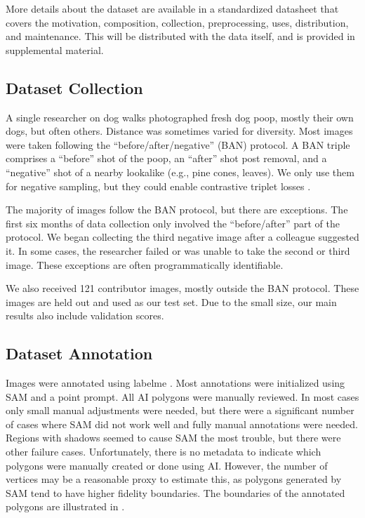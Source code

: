 \documentclass{article}
\begin{document}
More details about the dataset are available in a standardized datasheet
\cite{gebru_datasheets_2021} that covers the motivation, composition,
collection, preprocessing, uses, distribution, and maintenance. This will be
distributed with the data itself, and is provided in supplemental material.

\subsection{Dataset Collection}

A single researcher on dog walks photographed fresh dog poop, mostly their own
dogs, but often others. Distance was sometimes varied for diversity. Most
images were taken following the ``before/after/negative'' (BAN) protocol.  
A BAN triple comprises a ``before'' shot of the poop, an ``after'' shot
post removal, and a ``negative'' shot of a nearby lookalike (e.g., pine cones,
leaves).  We only use them for negative sampling, but they could enable
contrastive triplet losses \cite{schroff_facenet_2015}.

The majority of images follow the BAN protocol, but there are exceptions.
The first six months of data collection only involved the ``before/after'' part of the protocol. 
We began collecting the third negative image after a colleague suggested it.
In some cases, the researcher failed or was unable to take the second or third image.
These exceptions are often programmatically identifiable.
  
We also received 121 contributor images, mostly outside the BAN protocol.
These images are held out and used as our test set.
Due to the small size, our main results also include validation scores.

\subsection{Dataset Annotation}

Images were annotated using labelme \cite{wada_labelmeailabelme_nodate}.
Most annotations were initialized using SAM and a point prompt.
All AI polygons were manually reviewed.
In most cases only small manual adjustments were needed, but there were a significant number of cases where
  SAM did not work well and fully manual annotations were needed.
Regions with shadows seemed to cause SAM the most trouble, but there were other failure cases.
Unfortunately, there is no metadata to indicate which polygons were manually created or done using AI.
However, the number of vertices may be a reasonable proxy to estimate this, as polygons generated by SAM
  tend to have higher fidelity boundaries.
The boundaries of the annotated polygons are illustrated in .
\end{document}
